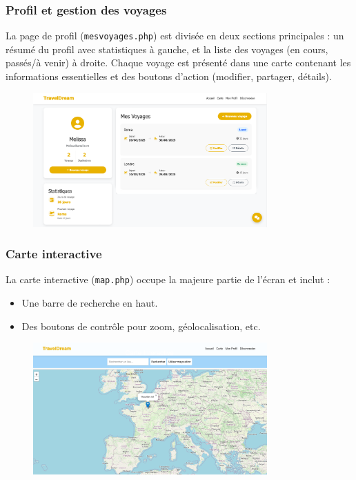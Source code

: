 \documentclass[a4paper,12pt]{article}
\begin{document}
\subsubsection{Profil et gestion des voyages}
La page de profil (\texttt{mesvoyages.php}) est divisée en deux sections principales : un résumé du profil avec statistiques à gauche, et la liste des voyages (en cours, passés/à venir) à droite. Chaque voyage est présenté dans une carte contenant les informations essentielles et des boutons d'action (modifier, partager, détails).
\begin{figure}[H]
    \centering
    \includegraphics[width=0.8\textwidth]{profil.png}
\end{figure}
\subsubsection{Carte interactive}
La carte interactive (\texttt{map.php}) occupe la majeure partie de l’écran et inclut :
\begin{itemize}
  \item Une barre de recherche en haut.
  \item Des boutons de contrôle pour zoom, géolocalisation, etc.
\end{itemize}
\begin{figure}[H]
    \centering
    \includegraphics[width=0.8\textwidth]{carte.png}
\end{figure}
\end{document}
